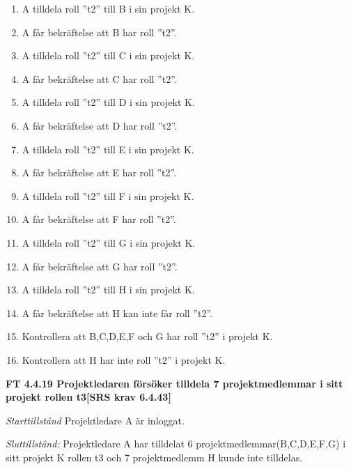 \documentclass[a4paper]{article}
\begin{document}
\begin{enumerate}
\item A tilldela roll ”t2” till B i sin projekt K. 
\item A får bekräftelse att B har roll ”t2”.
\item A tilldela roll ”t2” till C i sin projekt K. 
\item A får bekräftelse att C har roll ”t2”.
\item A tilldela roll ”t2” till D i sin projekt K. 
\item A får bekräftelse att D har roll ”t2”.
\item A tilldela roll ”t2” till E i sin projekt K. 
\item A får bekräftelse att E har roll ”t2”.
\item A tilldela roll ”t2” till F i sin projekt K. 
\item A får bekräftelse att F har roll ”t2”.
\item A tilldela roll ”t2” till G i sin projekt K. 
\item A får bekräftelse att G har roll ”t2”.
\item A tilldela roll ”t2” till H i sin projekt K. 
\item A får bekräftelse att H kan inte får roll ”t2”.
\item Kontrollera att B,C,D,E,F och G har roll ”t2” i projekt K.
\item Kontrollera att H har inte roll ”t2” i projekt K.
\end{enumerate}

\textbf{FT 4.4.19 Projektledaren försöker tilldela 7 projektmedlemmar i sitt projekt rollen t3[SRS krav 6.4.43]}

\emph{Starttillstånd} Projektledare A är inloggat.

\emph{Sluttillstånd:} Projektledare A  har tilldelat 6 projektmedlemmar(B,C,D,E,F,G) i sitt projekt K  rollen t3 och 7 projektmedlemm H kunde inte tilldelas.
\end{document}
